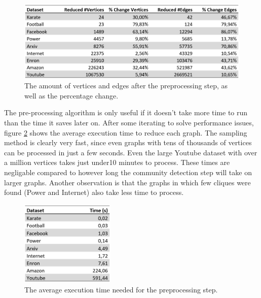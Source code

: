 \begin{figure}[H]
\begin{center}
\includegraphics[width=1\textwidth]{images/reducedtable.png}
\caption{The amount of vertices and edges after the preprocessing step, as well as the percentage change.}\label{fig:reducedtable}
\end{center}
\end{figure}

The pre-processing algorithm is only useful if it doesn't take more time to run than the time it saves later on. After some iterating to solve performance issues, figure \ref{fig:prespeed} shows the average execution time to reduce each graph. The sampling method is clearly very fast, since even graphs with tens of thousands of vertices can be processed in just a few seconds. Even the large Youtube dataset with over a million vertices takes just under10 minutes to process. These times are negligable compared to however long the community detection step will take on larger graphs. Another observation is that the graphs in which few cliques were found (Power and Internet) also take less time to process.

\begin{figure}[H]
\begin{center}
\includegraphics[width=0.4\textwidth]{images/prespeed.png}
\caption{The average execution time needed for the preprocessing step.}\label{fig:prespeed}
\end{center}
\end{figure}

